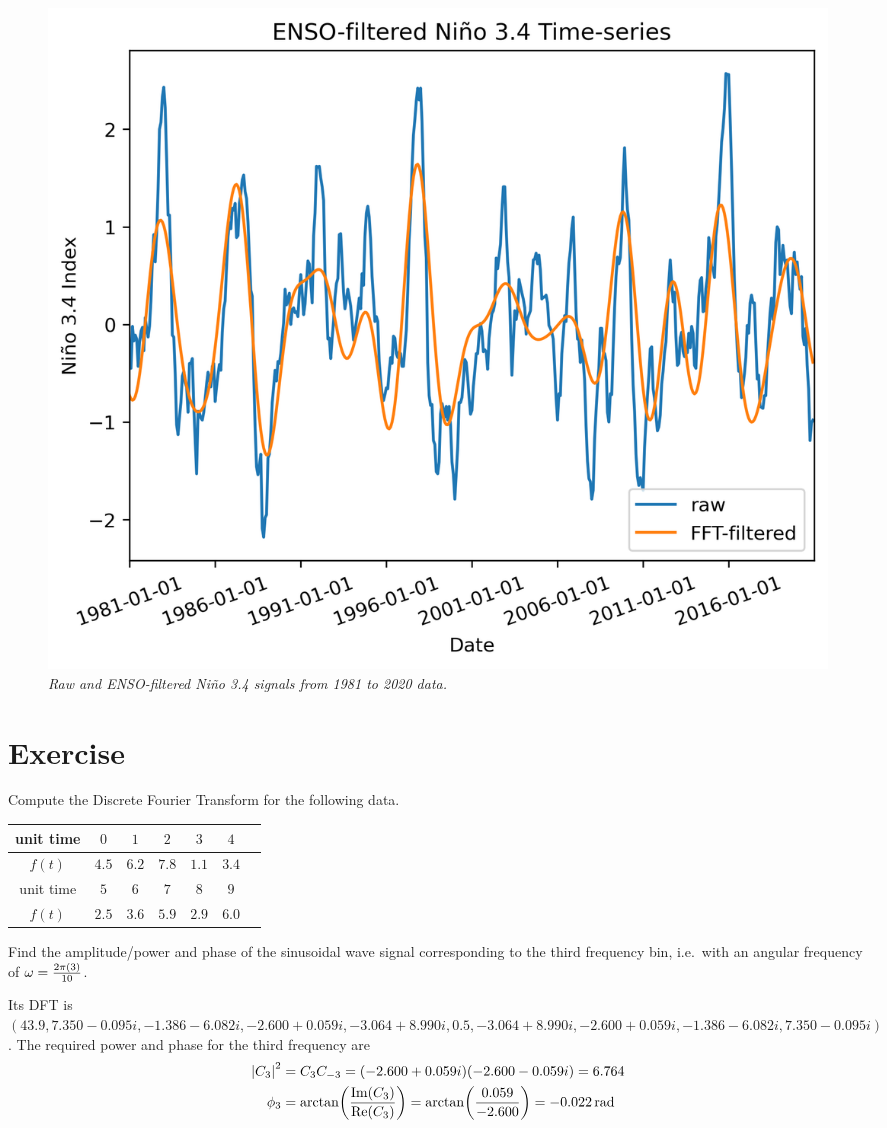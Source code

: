 \begin{figure}[ht!]
    \centering
    \includegraphics[scale=0.75]{graphics/NinoENSOFilter.png}
    \caption{\textit{Raw and ENSO-filtered Niño 3.4 signals from 1981 to 2020 data.}}
    \label{fig:nino2}
\end{figure}

\section{Exercise}
\begin{Exercise}
Compute the Discrete Fourier Transform for the following data.
\begin{center}
\begin{tabular}{|c|c|c|c|c|c|c|}
\hline
unit time & $0$ & $1$ & $2$ & $3$ & $4$ \\
\hline
$f(t)$ & $4.5$ & $6.2$ & $7.8$ & $1.1$ & $3.4$  \\
\hline
unit time & $5$ & $6$ & $7$ & $8$ & $9$ \\
\hline
$f(t)$ & $2.5$ & $3.6$ & $5.9$ & $2.9$ & $6.0$ \\
\hline
\end{tabular}
\end{center}
Find the amplitude/power and phase of the sinusoidal wave signal corresponding to the third frequency bin, i.e.\ with an angular frequency of $\omega = \smash{\frac{2\pi(3)}{10}}$. 
\end{Exercise}
\begin{Answer}
Its DFT is $(43.9, 7.350-0.095i, -1.386-6.082i, -2.600+0.059i, -3.064+8.990i, 0.5,  -3.064+8.990i, -2.600+0.059i, -1.386-6.082i, \allowbreak 7.350-0.095i)$. The required power and phase for the third frequency are 
\begin{align*}
\abs{C_3}^2 &= C_3C_{-3} = (-2.600+0.059i)(-2.600-0.059i) = 6.764 \\
\phi_3 &= \arctan(\frac{\Im(C_3)}{\Re(C_3)}) = \arctan(\frac{0.059}{-2.600}) = \SI{-0.022}{\radian}
\end{align*}
\end{Answer}

